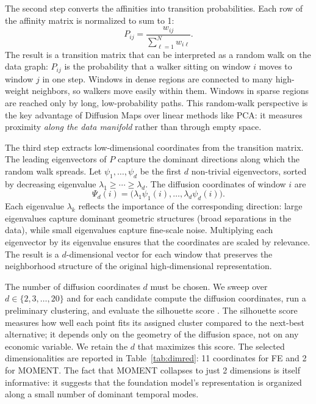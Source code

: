 \documentclass[12pt]{article}
\begin{document}
The second step converts the affinities into transition probabilities.
Each row of the affinity matrix is normalized to sum to 1:
\begin{equation}
P_{ij} =
\frac{w_{ij}}{\sum_{\ell=1}^{N} w_{i\ell}}.
\label{eq:diffusion_transition}
\end{equation}
The result is a transition matrix that can be interpreted as a random walk on the data graph: $P_{ij}$ is the probability that a walker sitting on window $i$ moves to window $j$ in one step.
Windows in dense regions are connected to many high-weight neighbors, so walkers move easily within them.
Windows in sparse regions are reached only by long, low-probability paths.
This random-walk perspective is the key advantage of Diffusion Maps over linear methods like PCA: it measures proximity \emph{along the data manifold} rather than through empty space.

The third step extracts low-dimensional coordinates from the transition matrix.
The leading eigenvectors of $P$ capture the dominant directions along which the random walk spreads.
Let $\psi_1,\ldots,\psi_d$ be the first $d$ non-trivial eigenvectors, sorted by decreasing eigenvalue $\lambda_1 \geq \cdots \geq \lambda_d$.
The diffusion coordinates of window $i$ are
\begin{equation}
\Psi_d(i)
=
\bigl(\lambda_1 \psi_1(i),\ldots,\lambda_d \psi_d(i)\bigr).
\label{eq:diffusion_coordinates}
\end{equation}
Each eigenvalue $\lambda_k$ reflects the importance of the corresponding direction: large eigenvalues capture dominant geometric structures (broad separations in the data), while small eigenvalues capture fine-scale noise.
Multiplying each eigenvector by its eigenvalue ensures that the coordinates are scaled by relevance.
The result is a $d$-dimensional vector for each window that preserves the neighborhood structure of the original high-dimensional representation.

The number of diffusion coordinates $d$ must be chosen.
We sweep over $d \in \{2, 3, \ldots, 20\}$ and for each candidate compute the diffusion coordinates, run a preliminary clustering, and evaluate the silhouette score \citep{rousseeuw1987}.
The silhouette score measures how well each point fits its assigned cluster compared to the next-best alternative; it depends only on the geometry of the diffusion space, not on any economic variable.
We retain the $d$ that maximizes this score.
The selected dimensionalities are reported in Table~\ref{tab:dimred}: 11 coordinates for FE and 2 for MOMENT.
The fact that MOMENT collapses to just 2 dimensions is itself informative: it suggests that the foundation model's representation is organized along a small number of dominant temporal modes.
\end{document}
